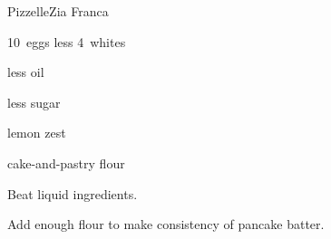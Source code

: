 \begin{recipe}{Pizzelle\FIXME}{Zia Franca}{}

\begin{ingredients}
\item 10~eggs less 4~whites
\item {} less  oil
\item {} less  sugar
\item lemon zest
\item {} 
\item cake-and-pastry flour
\end{ingredients}

\begin{directions}
\item Beat liquid ingredients.
\item Add enough flour to make consistency of pancake batter.
\end{directions}

\end{recipe}

